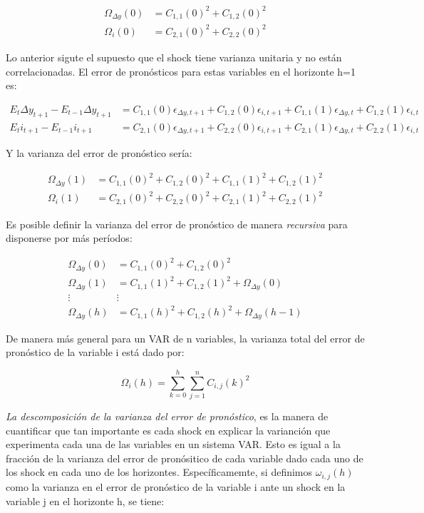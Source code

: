 \documentclass[
]{book}
\begin{document}
\begin{align}
\Omega_{\Delta y}(0)&=C_{1,1}(0)^{2}+C_{1,2}(0)^{2}\\
\Omega_{i}(0)       &=C_{2,1}(0)^{2}+C_{2,2}(0)^{2} 
\end{align}

Lo anterior sigute el supuesto que el shock tiene varianza unitaria y no están correlacionadas. El error de pronósticos para estas variables en el horizonte h=1 es:

\begin{align}
E_{t}\Delta y_{t+1}-E_{t-1}\Delta y_{t+1}&=C_{1,1}(0)\epsilon_{\Delta y, t+1}+C_{1,2}(0)\epsilon_{i, t+1}+C_{1,1}(1)\epsilon_{\Delta y, t}+C_{1,2}(1)\epsilon_{i, t}\\
E_{t}i_{t+1}-E_{t-1}i_{t+1}&=C_{2,1}(0)\epsilon_{\Delta y, t+1}+C_{2,2}(0)\epsilon_{i, t+1}+C_{2,1}(1)\epsilon_{\Delta y, t}+C_{2,2}(1)\epsilon_{i, t}
\end{align}

Y la varianza del error de pronóstico sería:

\begin{align}
\Omega_{\Delta y}(1)&=C_{1,1}(0)^{2}+C_{1,2}(0)^{2}+C_{1,1}(1)^{2}+C_{1,2}(1)^{2}\\
\Omega_{i}(1)       &=C_{2,1}(0)^{2}+C_{2,2}(0)^{2}+C_{2,1}(1)^{2}+C_{2,2}(1)^{2}  
\end{align}

Es posible definir la varianza del error de pronóstico de manera \emph{recursiva} para disponerse por más períodos:

\begin{align}
\Omega_{\Delta y}(0)&=C_{1,1}(0)^{2}+C_{1,2}(0)^{2}\\
\Omega_{\Delta y}(1)&=C_{1,1}(1)^{2}+C_{1,2}(1)^{2}+\Omega_{\Delta y}(0)\\
\vdots              &    \vdots\\
\Omega_{\Delta y}(h)&=C_{1,1}(h)^{2}+C_{1,2}(h)^{2}+\Omega_{\Delta y}(h-1)
\end{align}

De manera más general para un VAR de n variables, la varianza total del error de pronóstico de la variable i está dado por:

\begin{equation}
\Omega_{i}(h)=\sum_{k=0}^{h} \sum_{j=1}^{n}C_{i,j}(k)^{2}
\end{equation}

\emph{La descomposición de la varianza del error de pronóstico}, es la manera de cuantificar que tan importante es cada shock en explicar la varianción que experimenta cada una de las variables en un sistema VAR. Esto es igual a la fracción de la varianza del error de pronósitico de cada variable dado cada uno de los shock en cada uno de los horizontes. Específicamemte, si definimos \(\omega_{i,j}(h)\) como la varianza en el error de pronóstico de la variable i ante un shock en la variable j en el horizonte h, se tiene:
\end{document}
